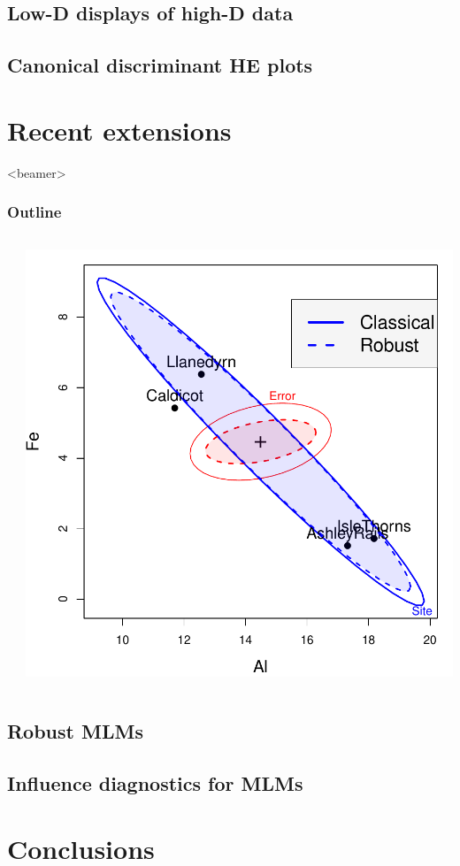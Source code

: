 \documentclass[10pt,t]{beamer}
\begin{document}
\subsection{Low-D displays of high-D data}

%
\subsection{Canonical discriminant HE plots}


\section{Recent extensions}
\begin{frame}<beamer>
  \frametitle{Outline}
	\begin{columns}[c]
	  \begin{column}{.6\textwidth}
	  \tableofcontents[currentsection]
	  \end{column}
	  \begin{column}{.4\textwidth}
	  \includegraphics[width=\textwidth]{figures/pottery-robust}
	  \end{column}
	\end{columns}
\end{frame}
\subsection{Robust MLMs}

\subsection{Influence diagnostics for MLMs}


\section{Conclusions}


%
\end{document}
